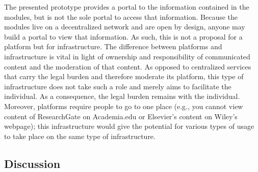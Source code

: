 \documentclass[a4paper]{article}
\begin{document}
The presented prototype provides a portal to the information contained
in the modules, but is not the sole portal to access that information.
Because the modules live on a decentralized network and are open by
design, anyone may build a portal to view that information. As such,
this is not a proposal for a platform but for infrastructure. The
difference between platforms and infrastructure is vital in light of
ownership and responsibility of communicated content and the moderation
of that content. As opposed to centralized services that carry the legal
burden and therefore moderate its platform, this type of infrastructure
does not take such a role and merely aims to facilitate the individual.
As a consequence, the legal burden remains with the individual.
Moreover, platforms require people to go to one place (e.g., you cannot
view content of ResearchGate on Academia.edu or Elsevier's content on
Wiley's webpage); this infrastructure would give the potential for
various types of usage to take place on the same type of infrastructure.

\hypertarget{discussion}{%
\subsection{Discussion}\label{discussion}}
\end{document}

